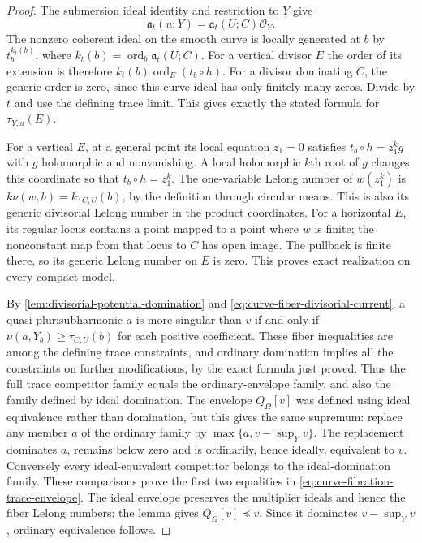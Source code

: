 \begin{proof}
The submersion ideal identity and restriction to $Y$ give
\[
 \mathfrak a_t(u;Y)=\mathfrak a_t(U;C)\mathcal O_Y.
\]
The nonzero coherent ideal on the smooth curve is locally generated at $b$ by $t_b^{k_t(b)}$, where $k_t(b)=\operatorname{ord}_b\mathfrak a_t(U;C)$. For a vertical divisor $E$ the order of its extension is therefore $k_t(b)\operatorname{ord}_E(t_b\circ h)$. For a divisor dominating $C$, the generic order is zero, since this curve ideal has only finitely many zeros. Divide by $t$ and use the defining trace limit. This gives exactly the stated formula for $\tau_{Y,u}(E)$.

For a vertical $E$, at a general point its local equation $z_1=0$ satisfies $t_b\circ h=z_1^k g$ with $g$ holomorphic and nonvanishing. A local holomorphic $k$th root of $g$ changes this coordinate so that $t_b\circ h=z_1^k$. The one-variable Lelong number of $w(z_1^k)$ is $k\nu(w,b)=k\tau_{C,U}(b)$, by the definition through circular means. This is also its generic divisorial Lelong number in the product coordinates. For a horizontal $E$, its regular locus contains a point mapped to a point where $w$ is finite; the nonconstant map from that locus to $C$ has open image. The pullback is finite there, so its generic Lelong number on $E$ is zero. This proves exact realization on every compact model.

By \cref{lem:divisorial-potential-domination} and \eqref{eq:curve-fiber-divisorial-current}, a quasi-plurisubharmonic $a$ is more singular than $v$ if and only if $\nu(a,Y_b)\geq\tau_{C,U}(b)$ for each positive coefficient. These fiber inequalities are among the defining trace constraints, and ordinary domination implies all the constraints on further modifications, by the exact formula just proved. Thus the full trace competitor family equals the ordinary-envelope family, and also the family defined by ideal domination. The envelope $Q_\Omega[v]$ was defined using ideal equivalence rather than domination, but this gives the same supremum: replace any member $a$ of the ordinary family by $\max\{a,v-\sup_Yv\}$. The replacement dominates $a$, remains below zero and is ordinarily, hence ideally, equivalent to $v$. Conversely every ideal-equivalent competitor belongs to the ideal-domination family. These comparisons prove the first two equalities in \eqref{eq:curve-fibration-trace-envelope}. The ideal envelope preserves the multiplier ideals and hence the fiber Lelong numbers; the lemma gives $Q_\Omega[v]\preceq v$. Since it dominates $v-\sup_Yv$, ordinary equivalence follows.


\end{proof}

